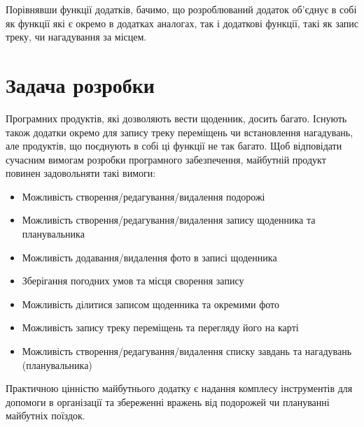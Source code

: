 \documentclass[../main.tex]{subfiles}
\begin{document}
Порівнявши функції додатків, бачимо, що розроблюваний додаток об'єднує в собі як функції які є окремо в додатках аналогах, так і додаткові функції, такі як запис треку, чи нагадування за місцем.

\section{Задача розробки}

Програмних продуктів, які дозволяють вести щоденник, досить багато. Існують також додатки окремо для запису треку переміщень чи встановлення нагадувань, але продуктів, що поєднують в собі ці функції не так багато.
Щоб відповідати сучасним вимогам розробки програмного забезпечення, майбутній продукт повинен задовольняти такі вимоги: 

\begin{itemize}
	\item Можливість створення/редагування/видалення подорожі
	\item Можливість створення/редагування/видалення запису щоденника та планувальника
	\item Можливість додавання/видалення фото в записі щоденника
	\item Зберігання погодних умов та місця сворення запису
	\item Можливість ділитися записом щоденника та окремими фото
	\item Можливість запису треку переміщень та перегляду його на карті
	\item Можливість створення/редагування/видалення списку завдань та нагадувань (планувальника)
\end{itemize}

Практичною цінністю майбутнього додатку є надання комплесу інструментів для допомоги в організації та збереженні вражень від подорожей чи плануванні майбутніх поїздок.
\end{document}
